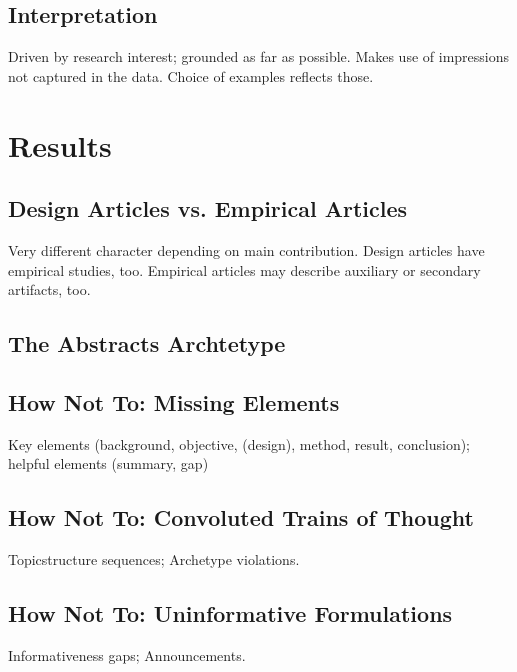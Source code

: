 \documentclass[10pt,journal,compsoc]{IEEEtran}
\begin{document}
\subsection{Interpretation}

\noindent
Driven by research interest; grounded as far as possible.
Makes use of impressions not captured in the data.
Choice of examples reflects those.


\section{Results}

\subsection{Design Articles vs. Empirical Articles}

\noindent
Very different character depending on main contribution.
Design articles have empirical studies, too.
Empirical articles may describe auxiliary or secondary artifacts, too.


\subsection{The Abstracts Archtetype}

\noindent



\subsection{How Not To: Missing Elements}

\noindent
Key elements (background, objective, (design), method, result, conclusion); helpful elements (summary, gap)


\subsection{How Not To: Convoluted Trains of Thought}

\noindent
Topicstructure sequences; Archetype violations.


\subsection{How Not To: Uninformative Formulations}

\noindent
Informativeness gaps; Announcements.
\end{document}
